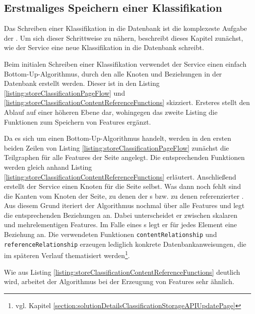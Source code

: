 \subsection{Erstmaliges Speichern einer Klassifikation}
    \label{section:solutionDetailsStorageAPIInitialWrite}
    Das Schreiben einer Klassifikation in die Datenbank ist die
    komplexeste Aufgabe der {\classificationStorageAPI}.
    Um sich dieser Schrittweise zu nähern, beschreibt dieses Kapitel zunächst,
    wie der Service eine neue Klassifikation in die Datenbank schreibt.

    Beim initialen Schreiben einer Klassifikation verwendet der Service einen
    einfach Bottom-Up-Algorithmus, durch den alle Knoten und Beziehungen
    in der Datenbank erstellt werden.
    Dieser ist in den Listing \ref{listing:storeClassificationPageFlow} und
    \ref{listing:storeClassificationContentReferenceFunctions} skizziert.
    Ersteres stellt den Ablauf auf einer höheren Ebene dar, wohingegen
    das zweite Listing die Funktionen zum Speichern von Features ergänzt.
    
    

    Da es sich um einen Bottom-Up-Algorithmus handelt,
    werden in den ersten beiden Zeilen von Listing \ref{listing:storeClassificationPageFlow}
    zunächst die Teilgraphen für alle Features der Seite angelegt.
    Die entsprechenden Funktionen werden gleich anhand Listing \ref{listing:storeClassificationContentReferenceFunctions} erläutert.
    Anschließend erstellt der Service einen Knoten für die Seite selbst.
    Was dann noch fehlt sind die Kanten vom Knoten der Seite,
    zu denen der {\contentFeature}s bzw. zu denen referenzierter {\resources}.
    Aus diesem Grund iteriert der Algorithmus nochmal über alle Features
    und legt die entsprechenden Beziehungen an.
    Dabei unterscheidet er zwischen skalaren und mehrelementigen Features.
    Im Falle eines {\collectionFeature}s legt er für jedes Element eine Beziehung an.
    Die verwendeten Funktionen \texttt{contentRelationship} und \texttt{referenceRelationship}
    erzeugen lediglich konkrete Datenbankanweisungen, die im späteren Verlauf thematisiert
    werden\footnote{vgl. Kapitel \ref{section:solutionDetailsClassificationStorageAPIUpdatePage}}.

    Wie aus Listing \ref{listing:storeClassificationContentReferenceFunctions} deutlich wird,
    arbeitet der Algorithmus bei der Erzeugung von Features sehr ähnlich.

